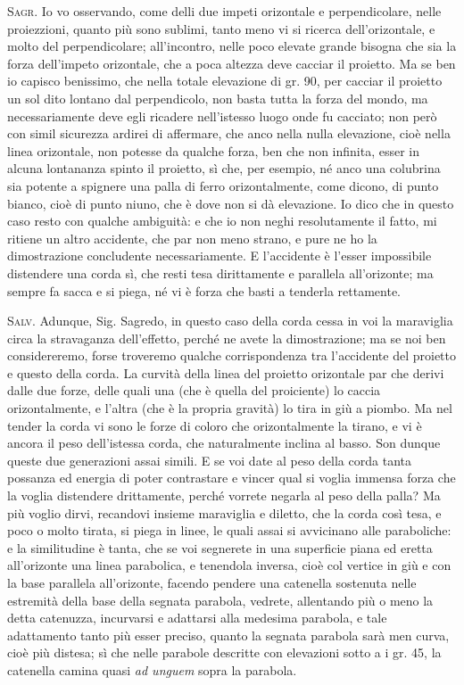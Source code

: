 \documentclass[11pt,twoside,openany]{book}
\newcommand{\speaker}[1]{\textcolor{rubric}{\textsc{#1}}\space}
\begin{document}
\speaker{Sagr.} Io vo osservando, come delli due impeti orizontale e perpendicolare, nelle proiezzioni, quanto più sono sublimi, tanto meno vi si ricerca dell'orizontale, e molto del perpendicolare; all'incontro, nelle poco elevate grande bisogna che sia la forza dell'impeto orizontale, che a poca altezza deve cacciar il proietto. Ma se ben io capisco benissimo, che nella totale elevazione di gr. 90, per cacciar il proietto un sol dito lontano dal perpendicolo, non basta tutta la forza del mondo, ma necessariamente deve egli ricadere nell'istesso luogo onde fu cacciato; non però con simil sicurezza ardirei di affermare, che anco nella nulla elevazione, cioè nella linea orizontale, non potesse da qualche forza, ben che non infinita, esser in alcuna lontananza spinto il proietto, sì che, per esempio, né anco una colubrina sia potente a spignere una palla di ferro orizontalmente, come dicono, di punto bianco, cioè di punto niuno, che è dove non si dà elevazione. Io dico che in questo caso resto con qualche ambiguità: e che io non neghi resolutamente il fatto, mi ritiene un altro accidente, che par non meno strano, e pure ne ho la dimostrazione concludente necessariamente. E l'accidente è l'esser impossibile distendere una corda sì, che resti tesa dirittamente e parallela all'orizonte; ma sempre fa sacca e si piega, né vi è forza che basti a tenderla rettamente.

\speaker{Salv.} Adunque, Sig. Sagredo, in questo caso della corda cessa in voi la maraviglia circa la stravaganza dell'effetto, perché ne avete la dimostrazione; ma se noi ben considereremo, forse troveremo qualche corrispondenza tra l'accidente del proietto e questo della corda. La curvità della linea del proietto orizontale par che derivi dalle due forze, delle quali una (che è quella del proiciente) lo caccia orizontalmente, e l'altra (che è la propria gravità) lo tira in giù a piombo. Ma nel tender la corda vi sono le forze di coloro che orizontalmente la tirano, e vi è ancora il peso dell'istessa corda, che naturalmente inclina al basso. Son dunque queste due generazioni assai simili. E se voi date al peso della corda tanta possanza ed energia di poter contrastare e vincer qual si voglia immensa forza che la voglia distendere drittamente, perché vorrete negarla al peso della palla? Ma più voglio dirvi, recandovi insieme maraviglia e diletto, che la corda così tesa, e poco o molto tirata, si piega in linee, le quali assai si avvicinano alle paraboliche: e la similitudine è tanta, che se voi segnerete in una superficie piana ed eretta all'orizonte una linea parabolica, e tenendola inversa, cioè col vertice in giù e con la base parallela all'orizonte, facendo pendere una catenella sostenuta nelle estremità della base della segnata parabola, vedrete, allentando più o meno la detta catenuzza, incurvarsi e adattarsi alla medesima parabola, e tale adattamento tanto più esser preciso, quanto la segnata parabola sarà men curva, cioè più distesa; sì che nelle parabole descritte con elevazioni sotto a i gr. 45, la catenella camina quasi \emph{ad unguem} sopra la parabola.
\end{document}
